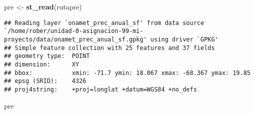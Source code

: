 \documentclass[11pt,]{article}
\newenvironment{Shaded}{\begin{snugshade}}{\end{snugshade}}
\newcommand{\KeywordTok}[1]{\textcolor[rgb]{0.13,0.29,0.53}{\textbf{#1}}}
\newcommand{\StringTok}[1]{\textcolor[rgb]{0.31,0.60,0.02}{#1}}
\newcommand{\NormalTok}[1]{#1}
\begin{document}
\begin{Shaded}
\begin{Highlighting}[]
\NormalTok{pre <-}\StringTok{ }\KeywordTok{st_read}\NormalTok{(rutapre)}
\end{Highlighting}
\end{Shaded}

\begin{verbatim}
## Reading layer `onamet_prec_anual_sf' from data source `/home/rober/unidad-0-asignacion-99-mi-proyecto/data/onamet_prec_anual_sf.gpkg' using driver `GPKG'
## Simple feature collection with 25 features and 37 fields
## geometry type:  POINT
## dimension:      XY
## bbox:           xmin: -71.7 ymin: 18.067 xmax: -68.367 ymax: 19.85
## epsg (SRID):    4326
## proj4string:    +proj=longlat +datum=WGS84 +no_defs
\end{verbatim}

\begin{Shaded}
\begin{Highlighting}[]
\NormalTok{pre}
\end{Highlighting}
\end{Shaded}
\end{document}
